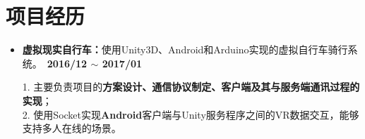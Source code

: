 \documentclass[letterpaper, UTF8, 11pt]{article}
\begin{document}
	\section*{\textbf{项目经历}}\vspace{-0.15in}
	\begin{itemize}	
		\item \textbf{虚拟现实自行车：}{使用Unity3D、Android和Arduino实现的虚拟自行车骑行系统。}~\textbf{2016/12 $\sim$ 2017/01}
		
		1. 主要负责项目的\textbf{方案设计、通信协议制定、客户端及其与服务端通讯过程的实现}；\\
		2. 使用Socket实现\textbf{Android}客户端与Unity服务程序之间的VR数据交互，能够支持多人在线的场景。
		\vspace{0.03in}
		
		

\end{itemize}
\end{document}
